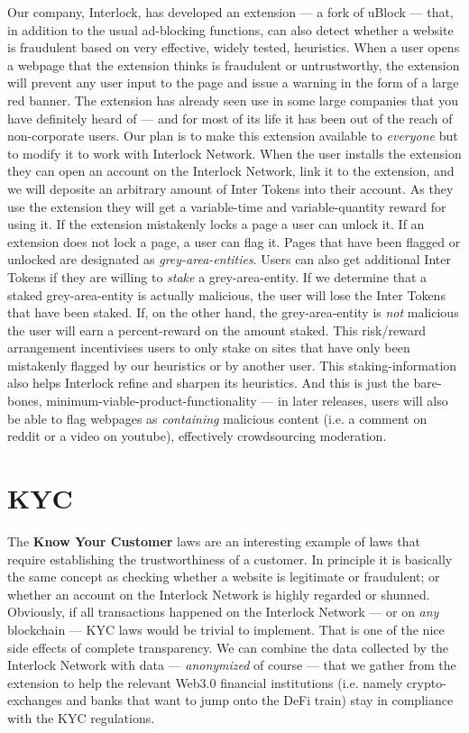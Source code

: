 \documentclass[a4paper]{article}
\begin{document}
Our company, Interlock, has developed an extension --- a fork of uBlock
--- that, in addition to the usual ad-blocking functions, can also
detect whether a website is fraudulent based on very effective, widely
tested, heuristics. When a user opens a webpage that the extension
thinks is fraudulent or untrustworthy, the extension will prevent any
user input to the page and issue a warning in the form of a large red
banner. The extension has already seen use in some large companies that
you have definitely heard of --- and for most of its life it has been
out of the reach of non-corporate users. Our plan is to make this
extension available to \emph{everyone} but to modify it to work with
Interlock Network. When the user installs the extension they can open an
account on the Interlock Network, link it to the extension, and we will
deposite an arbitrary amount of Inter Tokens into their account. As they
use the extension they will get a variable-time and variable-quantity
reward for using it. If the extension mistakenly locks a page a user can
unlock it. If an extension does not lock a page, a user can flag it.
Pages that have been flagged or unlocked are designated as \emph{
grey-area-entities}. Users can also get additional Inter Tokens if they
are willing to \emph{stake} a grey-area-entity. If we determine that a
staked grey-area-entity is actually malicious, the user will lose the
Inter Tokens that have been staked. If, on the other hand, the
grey-area-entity is \emph{not} malicious the user will earn a
percent-reward on the amount staked. This risk/reward arrangement
incentivises users to only stake on sites that have only been mistakenly
flagged by our heuristics or by another user. This staking-information
also helps Interlock refine and sharpen its heuristics. And this is just
the bare-bones, minimum-viable-product-functionality --- in later
releases, users will also be able to flag webpages as \emph{containing
} malicious content (i.e. a comment on reddit or a video on youtube),
effectively crowdsourcing moderation.

\section{KYC}

The \textbf{Know Your Customer} laws are an interesting example of
laws that require establishing the trustworthiness of a customer. In
principle it is basically the same concept as checking whether a website
is legitimate or fraudulent; or whether an account on the
Interlock Network is highly regarded or shunned. Obviously, if all
transactions happened on the Interlock Network --- or on \emph{any}
blockchain --- KYC laws would be trivial to implement. That is one of
the nice side effects of complete transparency. We can combine the data
collected by the Interlock Network with data --- \emph{anonymized} of
course --- that we gather from the extension to help the relevant Web3.0
financial institutions (i.e. namely crypto-exchanges and banks that want
to jump onto the DeFi train) stay in compliance with the KYC
regulations.
\end{document}
